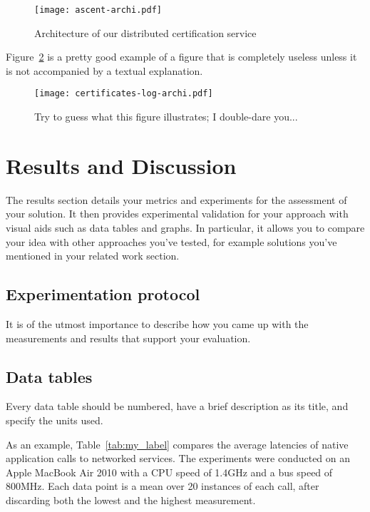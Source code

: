 \documentclass{scrartcl}
\begin{document}
\begin{figure}[H]
	\begin{center}
		\texttt{[image: ascent-archi.pdf]}
	\end{center}
	\caption{Architecture of our distributed certification service}
	\label{fig:ascent}
\end{figure}

Figure~\ref{fig:log-archi} is a pretty good example of a figure that is completely useless unless it is not accompanied by a textual explanation.

\begin{figure}
	\begin{center}
		\texttt{[image: certificates-log-archi.pdf]}
	\end{center}
	\caption{Try to guess what this figure illustrates; I double-dare you...}
	\label{fig:log-archi}
\end{figure}



\section{Results and Discussion}

The results section details your metrics and experiments for the assessment of your solution. It then provides experimental validation for your approach with visual aids such as data tables and graphs. In particular, it allows you to compare your idea with other approaches you've tested, for example solutions you've mentioned in your related work section.

\subsection{Experimentation protocol}

It is of the utmost importance to describe how you came up with the measurements and results that support your evaluation.

\subsection{Data tables}

Every data table should be numbered, have a brief description as its title, and specify the units used. 

As an example, Table~\ref{tab:my_label} compares the average latencies of native application calls to networked services. The experiments were conducted on an Apple MacBook Air 2010 with a CPU speed of 1.4GHz and a bus speed of 800MHz. Each data point is a mean over 20 instances of each call, after discarding both the lowest and the highest measurement.
\end{document}
